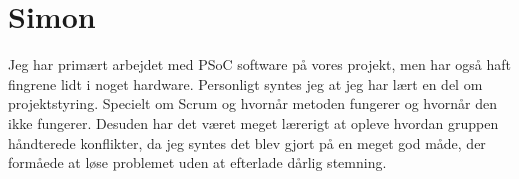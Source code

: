 \section{Simon}

Jeg har primært arbejdet med PSoC software på vores projekt, men har også haft fingrene lidt i noget hardware. Personligt syntes jeg at jeg har lært en del om projektstyring. Specielt om Scrum og hvornår metoden fungerer og hvornår den ikke fungerer. Desuden har det været meget lærerigt at opleve hvordan gruppen håndterede konflikter, da jeg syntes det blev gjort på en meget god måde, der formåede at løse problemet uden at efterlade dårlig stemning.